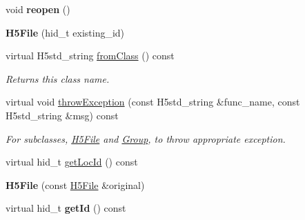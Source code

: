 \begin{DoxyCompactItemize}
\mbox{\label{class_h5_1_1_h5_file_addf8e9f932e7e4e53b27ab19a2dc1730}} 
void {\bfseries reopen} ()
\item 
\mbox{\label{class_h5_1_1_h5_file_a9c3cdbc2ab44d249e6bb34151256401c}} 
{\bfseries H5\+File} (hid\+\_\+t existing\+\_\+id)
\item 
\mbox{\label{class_h5_1_1_h5_file_ae3456c7a33bc2bcf0cdd782ad2641fff}} 
virtual H5std\+\_\+string \hyperlink{class_h5_1_1_h5_file_ae3456c7a33bc2bcf0cdd782ad2641fff}{from\+Class} () const
\begin{DoxyCompactList}\small\item\em Returns this class name. \end{DoxyCompactList}\item 
\mbox{\label{class_h5_1_1_h5_file_add05fd44e6543b5770e2a931c6ff648c}} 
virtual void \hyperlink{class_h5_1_1_h5_file_add05fd44e6543b5770e2a931c6ff648c}{throw\+Exception} (const H5std\+\_\+string \&func\+\_\+name, const H5std\+\_\+string \&msg) const
\begin{DoxyCompactList}\small\item\em For subclasses, \hyperlink{class_h5_1_1_h5_file}{H5\+File} and \hyperlink{class_h5_1_1_group}{Group}, to throw appropriate exception. \end{DoxyCompactList}\item 
virtual hid\+\_\+t \hyperlink{class_h5_1_1_h5_file_ab1c5775703262ac913dd164e77d60abc}{get\+Loc\+Id} () const
\item 
\mbox{\label{class_h5_1_1_h5_file_a912472f9bdf2bf90590a9e8ecaed3b99}} 
{\bfseries H5\+File} (const \hyperlink{class_h5_1_1_h5_file}{H5\+File} \&original)
\item 
\mbox{\label{class_h5_1_1_h5_file_a6eb07c395ad37fdca2f0150c4a5774c6}} 
virtual hid\+\_\+t {\bfseries get\+Id} () const
\end{DoxyCompactItemize}
